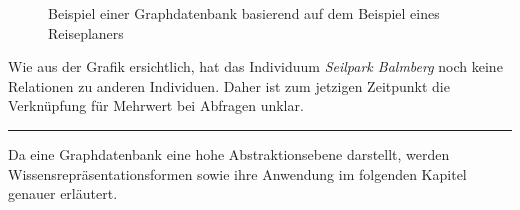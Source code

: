\begin{figure}[H]
\centering {}
\caption{Beispiel einer Graphdatenbank basierend auf dem Beispiel eines Reiseplaners\label{fig:protegebeispiel}\protect\footnotemark}
\end{figure}

Wie aus der Grafik ersichtlich, hat das Individuum \textit{Seilpark Balmberg} noch keine Relationen zu anderen Individuen. Daher ist zum jetzigen Zeitpunkt die Verknüpfung für Mehrwert bei Abfragen unklar.

\vspace{0.1pt}
\noindent\rule[1ex]{\textwidth}{1pt}

Da eine Graphdatenbank eine hohe Abstraktionsebene darstellt, werden Wissensrepräsentationsformen sowie ihre Anwendung im folgenden Kapitel genauer erläutert.
